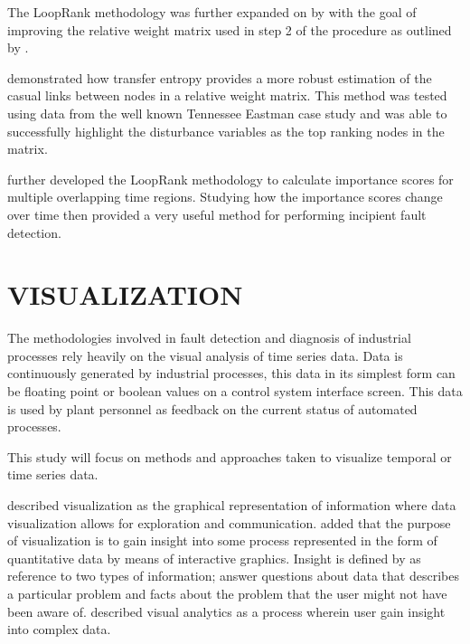 The LoopRank methodology was further expanded on by \cite{streicher2014eigenvector} with the goal of improving the relative weight matrix used in step 2 of the procedure as outlined by \cite{farenzena2009looprank}.\par

\cite{streicher2014eigenvector} demonstrated how transfer entropy provides a more robust estimation of the casual links between nodes in a relative weight matrix. This method was tested using data from the well known Tennessee Eastman case study and was able to successfully highlight the disturbance variables as the top ranking nodes in the matrix.\par

\cite{streicher2019plant} further developed the LoopRank methodology to calculate importance scores for multiple overlapping time regions. Studying how the importance scores change over time then provided a very useful method for performing incipient fault detection.\par

\section{VISUALIZATION}

The methodologies involved in fault detection and diagnosis of industrial processes rely heavily on the visual analysis of time series data. Data is continuously generated by industrial processes, this data in its simplest form can be floating point or boolean values on a control system interface screen. This data is used by plant personnel as feedback on the current status of automated processes.\par

This study will focus on methods and approaches taken to visualize temporal or time series data.\par 

\cite{few2009now} described visualization as the graphical representation of information where data visualization allows for exploration and communication. \cite{telea2014data} added that the purpose of visualization is to gain insight into some process represented in the form of quantitative data by means of interactive graphics. Insight is defined by \cite{telea2014data} as reference to two types of information; answer questions about data that describes a particular problem and facts about the problem that the user might not have been aware of.\cite{saraiya2006insight} described visual analytics as a process wherein user gain insight into complex data.

